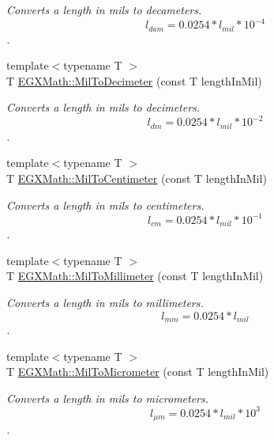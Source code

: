 \begin{DoxyCompactItemize}
\begin{DoxyCompactList}\small\item\em Converts a length in mils to decameters. \[ l_{dam}=0.0254* l_{mil} * 10^{-4} \]. \end{DoxyCompactList}\item 
{\footnotesize template$<$typename T $>$ }\\T \mbox{\hyperlink{group___e_g_x_math-_conversions-_length_conversions-_imperial-_mil-_s_i_gadc0ea330185b0ab7569f25cbab72322d}{E\+G\+X\+Math\+::\+Mil\+To\+Decimeter}} (const T length\+In\+Mil)
\begin{DoxyCompactList}\small\item\em Converts a length in mils to decimeters. \[ l_{dm}=0.0254* l_{mil} * 10^{-2} \]. \end{DoxyCompactList}\item 
{\footnotesize template$<$typename T $>$ }\\T \mbox{\hyperlink{group___e_g_x_math-_conversions-_length_conversions-_imperial-_mil-_s_i_ga8356e73011f6f7eb1df5e3dda75d7e28}{E\+G\+X\+Math\+::\+Mil\+To\+Centimeter}} (const T length\+In\+Mil)
\begin{DoxyCompactList}\small\item\em Converts a length in mils to centimeters. \[ l_{cm}=0.0254* l_{mil} * 10^{-1} \]. \end{DoxyCompactList}\item 
{\footnotesize template$<$typename T $>$ }\\T \mbox{\hyperlink{group___e_g_x_math-_conversions-_length_conversions-_imperial-_mil-_s_i_ga4abb75e6d0019b3a06c9912cfcdb9775}{E\+G\+X\+Math\+::\+Mil\+To\+Millimeter}} (const T length\+In\+Mil)
\begin{DoxyCompactList}\small\item\em Converts a length in mils to millimeters. \[ l_{mm}=0.0254* l_{mil} \]. \end{DoxyCompactList}\item 
{\footnotesize template$<$typename T $>$ }\\T \mbox{\hyperlink{group___e_g_x_math-_conversions-_length_conversions-_imperial-_mil-_s_i_ga696a1e5a2043b738df68bf2b9e9be4fc}{E\+G\+X\+Math\+::\+Mil\+To\+Micrometer}} (const T length\+In\+Mil)
\begin{DoxyCompactList}\small\item\em Converts a length in mils to micrometers. \[ l_{\mu m}=0.0254* l_{mil} * 10^{3} \]. \end{DoxyCompactList}\item 

\end{DoxyCompactItemize}
